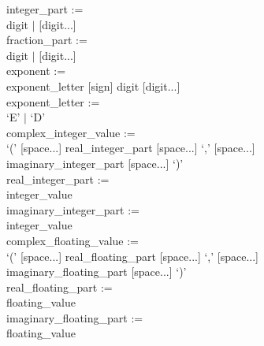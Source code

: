 \documentclass[11pt,makeidx]{book}     %
\begin{document}
integer\_part :=   \\ \null \hspace{0.5in}
	digit $|$ [digit...] \\

fraction\_part :=   \\ \null \hspace{0.5in}
	digit $|$ [digit...] \\

exponent :=   \\ \null \hspace{0.5in}
	exponent\_letter [sign] digit [digit...] \\

exponent\_letter :=   \\ \null \hspace{0.5in}
	`E' $|$ `D' \\

complex\_integer\_value :=   \\ \null \hspace{0.5in}
	`(' [space...] real\_integer\_part [space...] `,' 
	[space...]    \\ \null \hspace{0.5in}
	imaginary\_integer\_part [space...] `)' \\

real\_integer\_part :=   \\ \null \hspace{0.5in}
	integer\_value \\

imaginary\_integer\_part :=   \\ \null \hspace{0.5in}
	integer\_value \\

complex\_floating\_value :=   \\ \null \hspace{0.5in}
	`(' [space...] real\_floating\_part [space...] `,' 
	[space...]    \\ \null \hspace{0.5in}
	imaginary\_floating\_part [space...] `)' \\

real\_floating\_part :=   \\ \null \hspace{0.5in}
	floating\_value \\

imaginary\_floating\_part :=   \\ \null \hspace{0.5in}
	floating\_value \\
\end{document}
